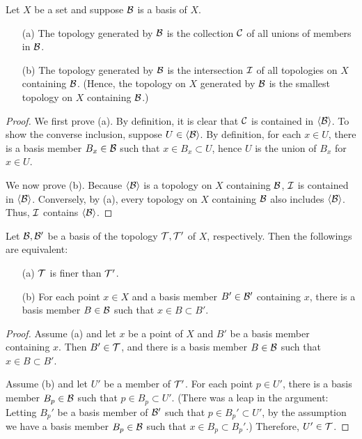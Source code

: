 \begin{obs}
    Let $X$ be a set and suppose ${\mathcal{B}}$ is a basis of $X$.
    \begin{enumerate}
        \item[(a)]
        {
            The topology generated by ${\mathcal{B}}$ is the collection ${\mathcal{C}}$ of all unions of members in ${\mathcal{B}}$.
        }
        \item[(b)]
        {
            The topology generated by ${\mathcal{B}}$ is the intersection ${\mathcal{I}}$ of all topologies on $X$ containing ${\mathcal{B}}$. (Hence, the topology on $X$ generated by ${\mathcal{B}}$ is the smallest topology on $X$ containing ${\mathcal{B}}$.)
        }
    \end{enumerate}
\end{obs}
\begin{proof}
    We first prove (a).
    By definition, it is clear that ${\mathcal{C}}$ is contained in ${\left\langle{{\mathcal{B}}}\right\rangle}$.
    To show the converse inclusion, suppose $U\in{\left\langle{{\mathcal{B}}}\right\rangle}$.
    By definition, for each $x\in U$, there is a basis member $B_x\in{\mathcal{B}}$ such that $x\in B_x\subset U$, hence $U$ is the union of $B_x$ for $x\in U$.

    We now prove (b).
    Because ${\left\langle{{\mathcal{B}}}\right\rangle}$ is a topology on $X$ containing ${\mathcal{B}}$, ${\mathcal{I}}$ is contained in ${\left\langle{{\mathcal{B}}}\right\rangle}$.
    Conversely, by (a), every topology on $X$ containing ${\mathcal{B}}$ also includes ${\left\langle{{\mathcal{B}}}\right\rangle}$.
    Thus, ${\mathcal{I}}$ contains ${\left\langle{{\mathcal{B}}}\right\rangle}$.
\end{proof}

\begin{lem}
    Let ${\mathcal{B}}, {\mathcal{B}}'$ be a basis of the topology ${\mathcal{T}}, {\mathcal{T}}'$ of $X$, respectively.
    Then the followings are equivalent:
    \begin{enumerate}
        \item[(a)]
        {
            ${\mathcal{T}}$ is finer than ${\mathcal{T}}'$.
        }
        \item[(b)]
        {
            For each point $x\in X$ and a basis member $B'\in{\mathcal{B}}'$ containing $x$, there is a basis member $B\in{\mathcal{B}}$ such that $x\in B\subset B'$.
        }
    \end{enumerate}
\end{lem}
\begin{proof}
    Assume (a) and let $x$ be a point of $X$ and $B'$ be a basis member containing $x$.
    Then $B'\in{\mathcal{T}}$, and there is a basis member $B\in{\mathcal{B}}$ such that $x\in B\subset B'$.

    Assume (b) and let $U'$ be a member of ${\mathcal{T}}'$.
    For each point $p\in U'$, there is a basis member $B_p\in{\mathcal{B}}$ such that $p\in B_p\subset U'$.
    (There was a leap in the argument: Letting $B_p'$ be a basis member of ${\mathcal{B}}'$ such that $p\in B_p'\subset U'$, by the assumption we have a basis member $B_p\in{\mathcal{B}}$ such that $x\in B_p\subset B_p'$.)
    Therefore, $U'\in{\mathcal{T}}$.
\end{proof}

